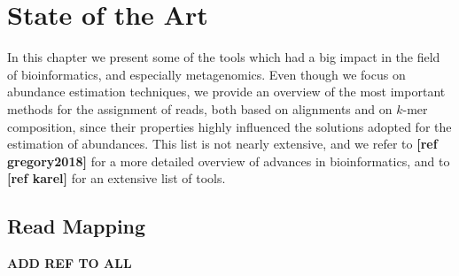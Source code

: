 
\chapter{State of the Art}
\label{Chapter2}

In this chapter we present some of the tools which had a big impact in the field of bioinformatics, and especially metagenomics. Even though we focus on abundance estimation techniques, we provide an overview of the most important methods for the assignment of reads, both based on alignments and on $k$-mer composition, since their properties highly influenced the solutions adopted for the estimation of abundances. This list is not nearly extensive, and we refer to \textbf{[ref gregory2018]} for a more detailed overview of advances in bioinformatics, and to \textbf{[ref karel]} for an extensive list of tools.

\section{Read Mapping}
\textbf{ADD REF TO ALL}
